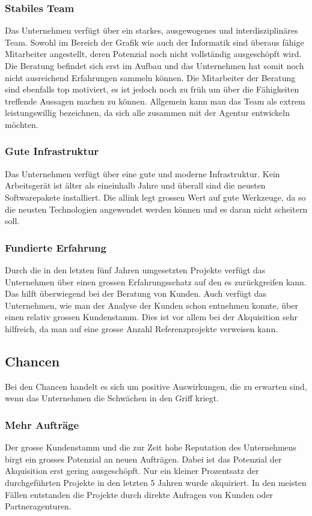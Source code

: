 \subsubsection{Stabiles Team}
Das Unternehmen verfügt über ein starkes, ausgewogenes und interdisziplinäres Team. 
Sowohl im Bereich der Grafik wie auch der Informatik sind überaus fähige Mitarbeiter 
angestellt, deren Potenzial noch nicht vollständig ausgeschöpft wird. Die Beratung
befindet sich erst im Aufbau und das Unternehmen hat somit noch nicht ausreichend
Erfahrungen sammeln können. Die Mitarbeiter der Beratung sind ebenfalls
top motiviert, es ist jedoch noch zu früh um über die Fähigkeiten treffende
Aussagen machen zu können. Allgemein kann man das Team als extrem leistungswillig
bezeichnen, da sich alle zusammen mit der Agentur entwickeln möchten.

\subsubsection{Gute Infrastruktur}
Das Unternehmen verfügt über eine gute und moderne Infrastruktur. Kein Arbeitsgerät
ist älter als eineinhalb Jahre und überall sind die neusten Softwarepakete installiert.
Die allink legt grossen Wert auf gute Werkzeuge, da so die neusten Technologien
angewendet werden können und es daran nicht scheitern soll.

\subsubsection{Fundierte Erfahrung}
Durch die in den letzten fünf Jahren umgesetzten Projekte verfügt das Unternehmen
über einen grossen Erfahrungsschatz auf den es zurückgreifen kann. Das hilft
überwiegend bei der Beratung von Kunden.
Auch verfügt das Unternehmen, wie man der Analyse der Kunden schon entnehmen
konnte, über einen relativ grossen Kundenstamm. Dies ist vor allem bei der
Akquisition sehr hilfreich, da man auf eine grosse Anzahl Referenzprojekte 
verweisen kann.

\subsection{Chancen}
Bei den Chancen handelt es sich um positive Auswirkungen, die zu erwarten sind,
wenn das Unternehmen die Schwächen in den Griff kriegt.

\subsubsection{Mehr Aufträge}
Der grosse Kundenstamm und die zur Zeit hohe Reputation des Unternehmens
birgt ein grosses Potenzial an neuen Aufträgen. Dabei ist das Potenzial der
Akquisition erst gering ausgeschöpft. Nur ein kleiner Prozentsatz der durchgeführten
Projekte in den letzten 5 Jahren wurde akquiriert. In den meisten Fällen entstanden
die Projekte durch direkte Anfragen von Kunden oder Partneragenturen.

